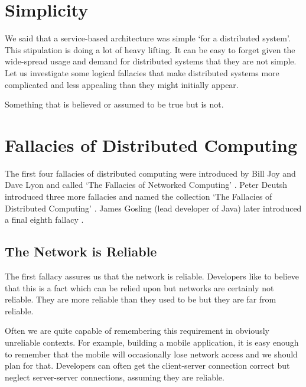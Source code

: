 \section{Simplicity}
We said that a service-based architecture was simple `for a distributed system'.
This stipulation is doing a lot of heavy lifting.
It can be easy to forget given the wide-spread usage and demand for distributed systems that they are not simple.
%
Let us investigate some logical fallacies that make distributed systems more complicated and less appealing than they might initially appear.

\begin{definition}[Fallacy]
Something that is believed or assumed to be true but is not.
\end{definition}

\section{Fallacies of Distributed Computing}
The first four fallacies of distributed computing were introduced by Bill Joy and Dave Lyon and called `The Fallacies of Networked Computing' \cite{four-fallacies}.
Peter Deutsh introduced three more fallacies and named the collection `The Fallacies of Distributed Computing' \cite{eight-fallacies}.
James Gosling (lead developer of Java) later introduced a final eighth fallacy \cite{four-fallacies}.

\subsection{The Network is Reliable}
The first fallacy assures us that the network is reliable.
Developers like to believe that this is a fact which can be relied upon but networks are certainly not reliable.
They are more reliable than they used to be but they are far from reliable.

Often we are quite capable of remembering this requirement in obviously unreliable contexts.
For example, building a mobile application,
it is easy enough to remember that the mobile will occasionally lose network access and we should plan for that.
Developers can often get the client-server connection correct but neglect server-server connections,
assuming they are reliable.

